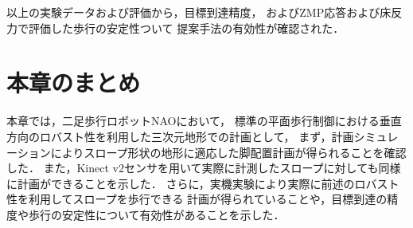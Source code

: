 \documentclass[autodetect-engine,dvipdfmx-if-dvi,ja=standard,a4j,jbase=11pt,magstyle=nomag*]{bxjsreport}
\begin{document}
以上の実験データおよび評価から，目標到達精度，
およびZMP応答および床反力で評価した歩行の安定性ついて
提案手法の有効性が確認された．


\section{本章のまとめ}
本章では，二足歩行ロボットNAOにおいて，
標準の平面歩行制御における垂直方向のロバスト性を利用した三次元地形での計画として，
まず，計画シミュレーションによりスロープ形状の地形に適応した脚配置計画が得られることを確認した．
また，Kinect v2センサを用いて実際に計測したスロープに対しても同様に計画ができることを示した．
さらに，実機実験により実際に前述のロバスト性を利用してスロープを歩行できる
計画が得られていることや，目標到達の精度や歩行の安定性について有効性があることを示した．
\end{document}

